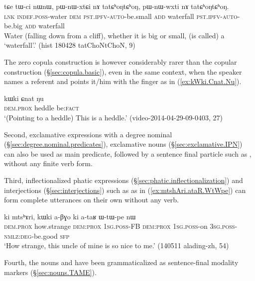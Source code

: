 \begin{exe}
	\ex \label{ex:tatChoNtChoN}
	\gll tɕe tɯ-ci nɯnɯ, pɯ-nɯ-xtɕi nɤ tatɕʰoŋtɕʰoŋ, pɯ-nɯ-wxti nɤ tatɕʰoŋtɕʰoŋ. \\
	\textsc{lnk} \textsc{indef}.\textsc{poss}-water \textsc{dem} \textsc{pst}.\textsc{ipfv}-\textsc{auto}-be.small \textsc{add} waterfall \textsc{pst}.\textsc{ipfv}-\textsc{auto}-be.big \textsc{add} waterfall \\
	\glt Water (falling down from a cliff), whether it is big or small, (is called) a `waterfall'.' 	(hist 180428 tatChoNtChoN, 9)
\end{exe}


The zero copula construction is however considerably rarer than the copular construction (§\ref{sec:copula.basic}), even in the same context, when the speaker names a referent and points it/him with the finger as in (\ref{ex:kWki.Cnat.Nu}).

\begin{exe}
\ex \label{ex:kWki.Cnat.Nu}
\gll  kɯki ɕnat ŋu \\
\textsc{dem}.\textsc{prox} heddle be:\textsc{fact} \\
\glt  `(Pointing to a heddle) This is a heddle.' (video-2014-04-29-09-0403, 27)
\end{exe}

Second, exclamative expressions with a degree nominal (§\ref{sec:degree.nominal.predicates}), exclamative nouns (§\ref{sec:exclamative.IPN}) can also be used as main predicate, followed by a sentence final particle such as , without any finite verb form.

Third, inflectionalized phatic expressions (§\ref{sec:phatic.inflectionalization}) and interjections  (§\ref{sec:interjections}) such as  as in (\ref{ex:mtshAri.ataR.WtWpe}) can form complete utterances on their own without any verb.

\begin{exe}
\ex \label{ex:mtshAri.ataR.WtWpe}
\gll ki mtsʰɤri, kɯki a-βɣo ki a-taʁ ɯ-tɯ-pe nɯ \\
\textsc{dem}.\textsc{prox}  how.strange \textsc{dem}:\textsc{prox} \textsc{1sg}.\textsc{poss}-FB \textsc{dem}:\textsc{prox} \textsc{1sg}.\textsc{poss}-on \textsc{3sg}.\textsc{poss}-\textsc{nmlz}:\textsc{deg}-be.good \textsc{sfp} \\
\glt `How strange, this uncle of mine is so nice to me.' (140511 alading-zh, 54)
\end{exe}

Fourth, the nouns  and  have been grammaticalized as sentence-final modality markers (§\ref{sec:nouns.TAME}).
  
